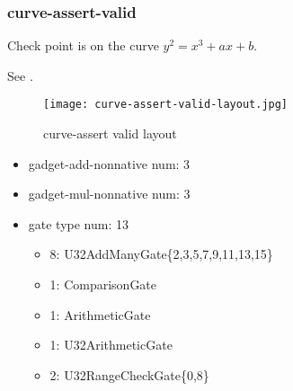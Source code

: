 \subsubsection{curve-assert-valid}

Check point is on the curve $y^2 = x^3 + ax + b$.

See .
\begin{figure}[!ht]
    \centering
    \texttt{[image: curve-assert-valid-layout.jpg]}
    \caption{curve-assert valid layout}
    \label{fig:curve-assert-valid-layout}
\end{figure}

\begin{itemize}
    \item gadget-add-nonnative num: 3
    \item gadget-mul-nonnative num: 3
    \item gate type num: 13
        \begin{itemize}
            \item 8: U32AddManyGate\{2,3,5,7,9,11,13,15\}
            \item 1: ComparisonGate
            \item 1: ArithmeticGate
            \item 1: U32ArithmeticGate
            \item 2: U32RangeCheckGate\{0,8\}
        \end{itemize}
\end{itemize}
